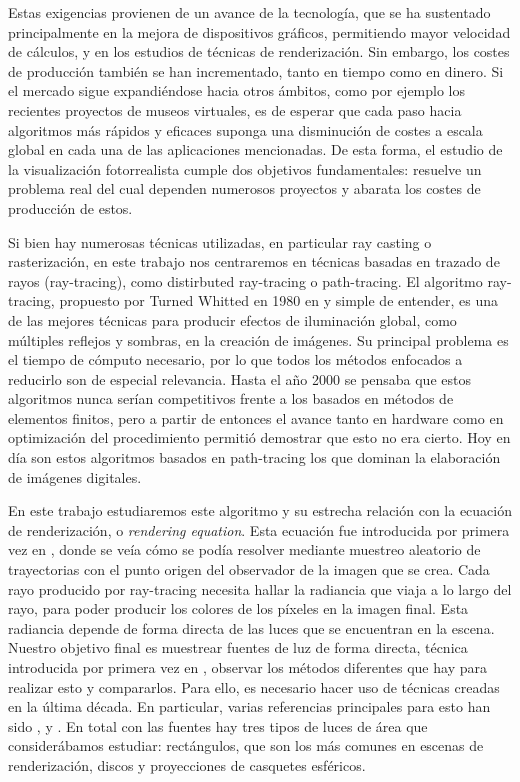 \documentclass{scrbook}
\begin{document}
Estas exigencias provienen de un avance de la tecnología, que se ha sustentado principalmente en la mejora de dispositivos gráficos, permitiendo mayor velocidad de cálculos, y en los estudios de técnicas de renderización. Sin embargo, los costes de producción también se han incrementado, tanto en tiempo como en dinero. Si el mercado sigue expandiéndose hacia otros ámbitos, como por ejemplo los recientes proyectos de museos virtuales, es de esperar que cada paso hacia algoritmos más rápidos y eficaces suponga una disminución de costes a escala global en cada una de las aplicaciones mencionadas. De esta forma, el estudio de la visualización fotorrealista cumple dos objetivos fundamentales: resuelve un problema real del cual dependen numerosos proyectos y abarata los costes de producción de estos. 

Si bien hay numerosas técnicas utilizadas, en particular ray casting o rasterización, en este trabajo nos centraremos en técnicas basadas en trazado de rayos (ray-tracing), como distirbuted ray-tracing o path-tracing. El algoritmo ray-tracing, propuesto por Turned Whitted en 1980 en \cite{Whitted} y simple de entender, es una de las mejores técnicas para producir efectos de iluminación global, como múltiples reflejos y sombras, en la creación de imágenes. Su principal problema es el tiempo de cómputo necesario, por lo que todos los métodos enfocados a reducirlo son de especial relevancia. Hasta el año 2000 se pensaba que estos algoritmos nunca serían competitivos frente a los basados en métodos de elementos finitos, pero a partir de entonces el avance tanto en hardware como en optimización del procedimiento permitió demostrar que esto no era cierto. Hoy en día son estos algoritmos basados en path-tracing los que dominan la elaboración de imágenes digitales.

En este trabajo estudiaremos este algoritmo y su estrecha relación con la ecuación de renderización, o \textit{rendering equation}. Esta ecuación fue introducida por primera vez en \cite{kajiya}, donde se veía cómo se podía resolver mediante muestreo aleatorio de trayectorias con el punto origen del observador de la imagen que se crea. Cada rayo producido por ray-tracing necesita hallar la radiancia que viaja a lo largo del rayo, para poder producir los colores de los píxeles en la imagen final. Esta radiancia depende de forma directa de las luces que se encuentran en la escena. Nuestro objetivo final es muestrear fuentes de luz de forma directa, técnica introducida por primera vez en \cite{cook}, observar los métodos diferentes que hay para realizar esto y compararlos. Para ello, es necesario hacer uso de técnicas creadas en la última década. En particular, varias referencias principales para esto han sido \cite{ur2013}, \cite{ur2017} y \cite{ur2018}. En total con las fuentes hay tres tipos de luces de área que considerábamos estudiar: rectángulos, que son los más comunes en escenas de renderización, discos y proyecciones de casquetes esféricos. 
\end{document}
